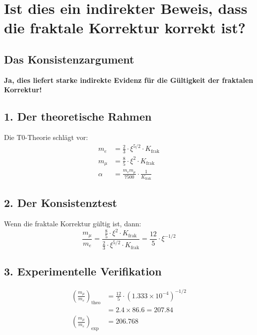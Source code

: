 \documentclass[12pt,a4paper]{article}
\begin{document}
\section{Ist dies ein indirekter Beweis, dass die fraktale Korrektur korrekt ist?}

\subsection{Das Konsistenzargument}

\begin{tcolorbox}[colback=green!5!white,colframe=green!75!black]
	\textbf{Ja, dies liefert starke indirekte Evidenz für die Gültigkeit der fraktalen Korrektur!}
\end{tcolorbox}

\subsection{1. Der theoretische Rahmen}

Die T0-Theorie schlägt vor:
\begin{align*}
	m_e &= \frac{2}{3} \cdot \xi^{5/2} \cdot K_{\text{frak}} \\
	m_\mu &= \frac{8}{5} \cdot \xi^2 \cdot K_{\text{frak}} \\
	\alpha &= \frac{m_e m_\mu}{7500} \cdot \frac{1}{K_{\text{frak}}}
\end{align*}

\subsection{2. Der Konsistenztest}

Wenn die fraktale Korrektur gültig ist, dann:
\[
\frac{m_\mu}{m_e} = \frac{\frac{8}{5} \cdot \xi^2 \cdot K_{\text{frak}}}{\frac{2}{3} \cdot \xi^{5/2} \cdot K_{\text{frak}}} = \frac{12}{5} \cdot \xi^{-1/2}
\]

\subsection{3. Experimentelle Verifikation}

\begin{align*}
	\left(\frac{m_\mu}{m_e}\right)_{\text{theo}} &= \frac{12}{5} \cdot (1.333 \times 10^{-4})^{-1/2} \\
	&= 2.4 \times 86.6 = 207.84 \\
	\left(\frac{m_\mu}{m_e}\right)_{\text{exp}} &= 206.768
\end{align*}
\end{document}
